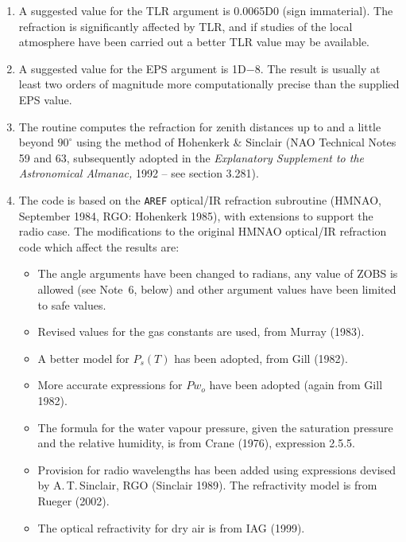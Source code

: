 \documentclass[11pt,twoside]{article}
\begin{document}
{
 \begin{enumerate}
  \item A suggested value for the TLR argument is 0.0065D0 (sign immaterial).
        The refraction is significantly affected by TLR, and if studies
        of the local atmosphere have been carried out a better TLR
        value may be available.
  \item A suggested value for the EPS argument is 1D$-$8.  The result is
        usually at least two orders of magnitude more computationally
        precise than the supplied EPS value.
  \item The routine computes the refraction for zenith distances up
        to and a little beyond $90^\circ$ using the method of Hohenkerk
        \& Sinclair (NAO Technical Notes 59 and 63, subsequently adopted
        in the {\it Explanatory Supplement to the Astronomical Almanac,}\/
        1992 -- see section 3.281).
 \item The code is based on the {\tt AREF}
       optical/IR refraction subroutine
       (HMNAO, September 1984, RGO: Hohenkerk 1985),
       with extensions to
       support the radio case.  The modifications to the original HMNAO
       optical/IR refraction code which affect the results are:
       \begin{itemize}
        \item The angle arguments have been changed to radians,
              any value of ZOBS is allowed (see Note~6, below) and
              other argument values have been limited to safe values.
        \item Revised values for the gas constants are used, from
              Murray (1983).
        \item A better model for $P_s(T)$ has been adopted,
              from Gill (1982).
        \item More accurate expressions for $Pw_o$ have been adopted
              (again from Gill 1982).
        \item The formula for the water vapour pressure, given the
              saturation pressure and the relative humidity, is from
              Crane (1976), expression 2.5.5.
        \item Provision for radio wavelengths has been added using
              expressions devised by A.\,T.\,Sinclair, RGO (Sinclair 1989).
              The refractivity model is from Rueger (2002).
        \item The optical refractivity for dry air is from IAG (1999).
       \end{itemize}

\end{enumerate}}
\end{document}
